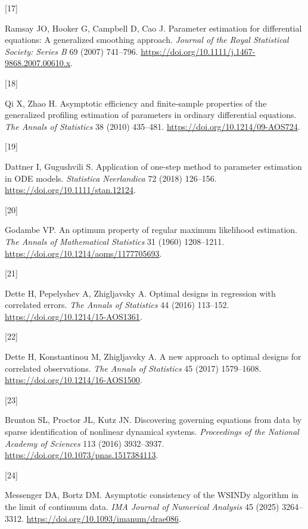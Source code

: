 \documentclass[ejs]{imsart}
\newlength{\cslhangindent}\setlength{\cslhangindent}{1.5em}
\newlength{\csllabelwidth}\setlength{\csllabelwidth}{3em}
\newenvironment{CSLReferences}[2]
 {\begin{list}{}{\setlength{\itemindent}{0pt}\setlength{\leftmargin}{0pt}\setlength{\parsep}{0pt}
 \ifodd #1\setlength{\leftmargin}{\cslhangindent}\setlength{\itemindent}{-1\cslhangindent}\fi
 \setlength{\itemsep}{#2\baselineskip}}}{\end{list}}
\newcommand{\CSLLeftMargin}[1]{\parbox[t]{\csllabelwidth}{\strut#1\strut}}
\newcommand{\CSLRightInline}[1]{\parbox[t]{\linewidth-\csllabelwidth}{\strut#1\strut}}
\begin{document}
\begin{CSLReferences}{0}{0}
\CSLLeftMargin{{[}17{]} }%
\CSLRightInline{Ramsay JO, Hooker G, Campbell D, Cao J. Parameter
estimation for differential equations: A generalized smoothing approach.
\emph{Journal of the Royal Statistical Society: Series B} 69 (2007)
741--796. \url{https://doi.org/10.1111/j.1467-9868.2007.00610.x}.}

\CSLLeftMargin{{[}18{]} }%
\CSLRightInline{Qi X, Zhao H. Asymptotic efficiency and finite-sample
properties of the generalized profiling estimation of parameters in
ordinary differential equations. \emph{The Annals of Statistics} 38
(2010) 435--481. \url{https://doi.org/10.1214/09-AOS724}.}

\CSLLeftMargin{{[}19{]} }%
\CSLRightInline{Dattner I, Gugushvili S. Application of one-step method
to parameter estimation in {ODE} models. \emph{Statistica Neerlandica}
72 (2018) 126--156. \url{https://doi.org/10.1111/stan.12124}.}

\CSLLeftMargin{{[}20{]} }%
\CSLRightInline{Godambe VP. An optimum property of regular maximum
likelihood estimation. \emph{The Annals of Mathematical Statistics} 31
(1960) 1208--1211. \url{https://doi.org/10.1214/aoms/1177705693}.}

\CSLLeftMargin{{[}21{]} }%
\CSLRightInline{Dette H, Pepelyshev A, Zhigljavsky A. Optimal designs in
regression with correlated errors. \emph{The Annals of Statistics} 44
(2016) 113--152. \url{https://doi.org/10.1214/15-AOS1361}.}

\CSLLeftMargin{{[}22{]} }%
\CSLRightInline{Dette H, Konstantinou M, Zhigljavsky A. A new approach
to optimal designs for correlated observations. \emph{The Annals of
Statistics} 45 (2017) 1579--1608.
\url{https://doi.org/10.1214/16-AOS1500}.}

\CSLLeftMargin{{[}23{]} }%
\CSLRightInline{Brunton SL, Proctor JL, Kutz JN. Discovering governing
equations from data by sparse identification of nonlinear dynamical
systems. \emph{Proceedings of the National Academy of Sciences} 113
(2016) 3932--3937. \url{https://doi.org/10.1073/pnas.1517384113}.}

\CSLLeftMargin{{[}24{]} }%
\CSLRightInline{Messenger DA, Bortz DM. Asymptotic consistency of the
{WSINDy} algorithm in the limit of continuum data. \emph{IMA Journal of
Numerical Analysis} 45 (2025) 3264--3312.
\url{https://doi.org/10.1093/imanum/drae086}.}


\end{CSLReferences}
\end{document}
